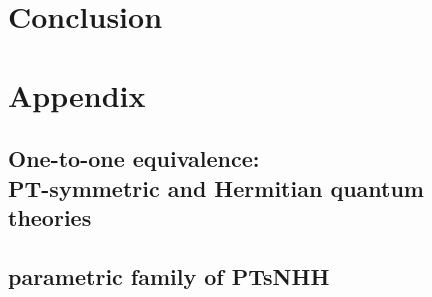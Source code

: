 \documentclass[12pt, a4paper]{report}
\newcommand\PT{\(\mathcal{PT}\)}
\begin{document}





\chapter{Conclusion}\label{Conclusion}





%


\chapter{Appendix}\label{appendix}

\section*{One-to-one equivalence:\\ PT-symmetric and Hermitian quantum theories}



\section*{parametric family of PTsNHH}
\end{document}
